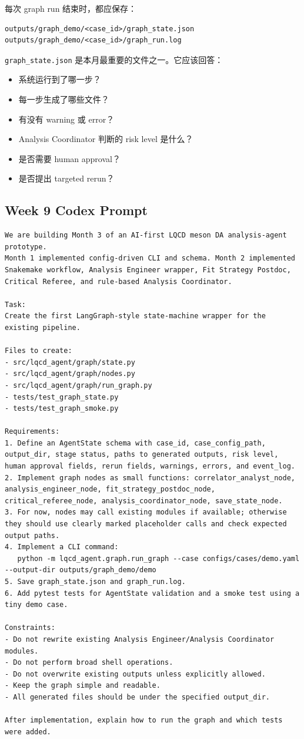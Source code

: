 \documentclass[11pt,a4paper,fontset=none]{ctexart}
\begin{document}
每次 graph run 结束时，都应保存：

\begin{lstlisting}
outputs/graph_demo/<case_id>/graph_state.json
outputs/graph_demo/<case_id>/graph_run.log
\end{lstlisting}

\texttt{graph\_state.json} 是本月最重要的文件之一。它应该回答：

\begin{itemize}[leftmargin=2em]
  \item 系统运行到了哪一步？
  \item 每一步生成了哪些文件？
  \item 有没有 warning 或 error？
  \item Analysis Coordinator 判断的 risk level 是什么？
  \item 是否需要 human approval？
  \item 是否提出 targeted rerun？
\end{itemize}

\subsection{Week 9 Codex Prompt}

\begin{lstlisting}
We are building Month 3 of an AI-first LQCD meson DA analysis-agent prototype.
Month 1 implemented config-driven CLI and schema. Month 2 implemented Snakemake workflow, Analysis Engineer wrapper, Fit Strategy Postdoc, Critical Referee, and rule-based Analysis Coordinator.

Task:
Create the first LangGraph-style state-machine wrapper for the existing pipeline.

Files to create:
- src/lqcd_agent/graph/state.py
- src/lqcd_agent/graph/nodes.py
- src/lqcd_agent/graph/run_graph.py
- tests/test_graph_state.py
- tests/test_graph_smoke.py

Requirements:
1. Define an AgentState schema with case_id, case_config_path, output_dir, stage status, paths to generated outputs, risk level, human approval fields, rerun fields, warnings, errors, and event_log.
2. Implement graph nodes as small functions: correlator_analyst_node, analysis_engineer_node, fit_strategy_postdoc_node, critical_referee_node, analysis_coordinator_node, save_state_node.
3. For now, nodes may call existing modules if available; otherwise they should use clearly marked placeholder calls and check expected output paths.
4. Implement a CLI command:
   python -m lqcd_agent.graph.run_graph --case configs/cases/demo.yaml --output-dir outputs/graph_demo/demo
5. Save graph_state.json and graph_run.log.
6. Add pytest tests for AgentState validation and a smoke test using a tiny demo case.

Constraints:
- Do not rewrite existing Analysis Engineer/Analysis Coordinator modules.
- Do not perform broad shell operations.
- Do not overwrite existing outputs unless explicitly allowed.
- Keep the graph simple and readable.
- All generated files should be under the specified output_dir.

After implementation, explain how to run the graph and which tests were added.
\end{lstlisting}
\end{document}
